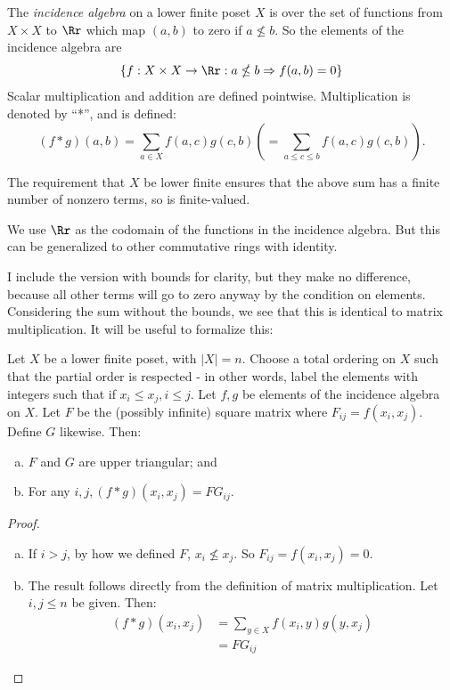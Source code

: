 \documentclass[12pt]{pom_thesis}
\begin{document}
\begin{defn}
The \emph{incidence algebra} on a lower finite poset $X$ is over the set of functions from $X \times X$ to $\Rr$ which map $(a,b)$ to zero if $a \nleq b$. So the elements of the incidence algebra are 
\[\{f:X \times X \rightarrow \Rr:a \nleq b \Rightarrow f(a,b) = 0\}
\]
Scalar multiplication and addition are defined pointwise.  Multiplication is denoted by ``*'', and is defined:
\[(f* g)(a,b) = \sum_{a \in X}f(a,c)g(c,b) \left( = \sum_{a \leq c \leq b}f(a,c)g(c,b)\right).\]
\end{defn}
\begin{rmk}
The requirement that $X$ be lower finite ensures that the above sum has a finite number of nonzero terms, so is finite-valued.
\end{rmk}
\begin{rmk}
We use $\Rr$ as the codomain of the functions in the incidence algebra. But this can be generalized to other commutative rings with identity.
\end{rmk}
I include the version with bounds for clarity, but they make no difference, because all other terms will go to zero anyway by the condition on elements. Considering the sum without the bounds, we see that this is identical to matrix multiplication. It will be useful to formalize this:
\begin{lemma}\label{mat_eq}
Let $X$ be a lower finite poset, with $|X|=n$. Choose a total ordering on $X$ such that the partial order is respected - in other words, label the elements with integers such that if $x_i \leq x_j, i \leq j$. Let $f,g$ be elements of the incidence algebra on $X$. Let $F$ be the (possibly infinite) square matrix where $F_{ij}=f(x_i, x_j)$. Define $G$ likewise. Then:
\begin{enumerate}[a)]
\item $F$ and $G$ are upper triangular; and
\item For any $i,j, (f * g)(x_i, x_j)=FG_{ij}$.
\end{enumerate}
\end{lemma}
\begin{proof}
\begin{enumerate}[a)]
\item If $i>j$, by how we defined $F$, $x_i \nleq x_j$. So $F_{ij} = f(x_i, x_j) = 0$. 
\item
The result follows directly from the definition of matrix multiplication. Let $i,j\leq n$ be given. Then:
\begin{align*}
(f * g)(x_i, x_j) &= \sum_{y \in X} f(x_i,y)g(y,x_j)\\
&=FG_{ij}
\end{align*}
\end{enumerate}
\end{proof}
\end{document}
